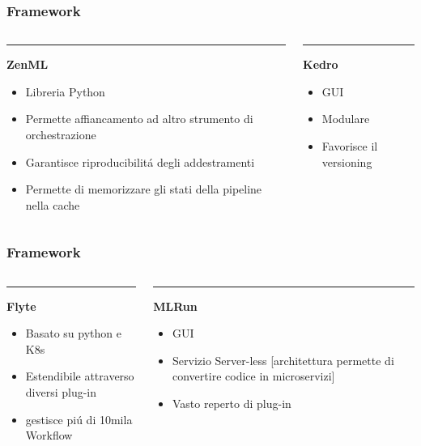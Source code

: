 \documentclass[xcolor=dvipsnames]{beamer}
\begin{document}
\begin{frame}
    \frametitle{Framework}
    \begin{columns}[T]
    \begin{column}{0.48\textwidth}
        \color{MSUgreen}\rule{\linewidth}{4pt}
        \textbf{ZenML}
        \begin{itemize}
            \item Libreria Python
            \item Permette affiancamento ad altro strumento di orchestrazione
            \item Garantisce riproducibilitá degli addestramenti
             \item Permette di memorizzare gli stati della pipeline nella cache %
        \end{itemize}
    \end{column}
    
    \begin{column}{0.48\textwidth}
    \color{MSUgreen!40!white}\rule{\linewidth}{4pt}
    
    \textbf{Kedro}    
    \begin{itemize}
        \item GUI
        \item Modulare
        \item Favorisce il versioning
    \end{itemize}
    \end{column}
    \end{columns}
\end{frame}

\begin{frame}
    \frametitle{Framework}
    \begin{columns}[T]
    \begin{column}{0.48\textwidth}
        \color{MSUgreen!60!white}\rule{\linewidth}{4pt}
        \textbf{Flyte}
    \begin{itemize}
        \item Basato su python e K8s
        \item Estendibile attraverso diversi plug-in
        \item gestisce piú di 10mila Workflow
    \end{itemize}
    \end{column}
    
    \begin{column}{0.48\textwidth}
    \color{MSUgreen!30}\rule{\linewidth}{4pt}
    \textbf{MLRun}
    \begin{itemize}
        \item GUI 
        \item Servizio Server-less [architettura permette di convertire codice in microservizi]
        \item Vasto reperto di plug-in
    \end{itemize}
    \end{column}
    \end{columns}
\end{frame}
\end{document}
